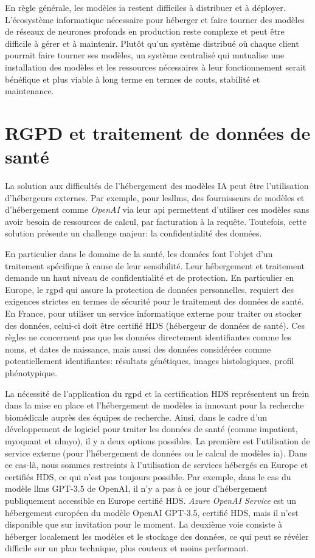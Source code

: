 En règle générale, les modèles \gls{ia} restent difficiles à distribuer et à déployer. L'écosystème informatique nécessaire pour héberger et faire tourner des modèles de réseaux de neurones profonds en production reste complexe et peut être difficile à gérer et à maintenir. Plutôt qu'un système distribué où chaque client pourrait faire tourner ses modèles, un système centralisé qui mutualise une installation des modèles et les ressources nécessaires à leur fonctionnement serait bénéfique et plus viable à long terme en termes de couts, stabilité et maintenance.

\section{RGPD et traitement de données de santé}
La solution aux difficultés de l'hébergement des modèles IA peut être l'utilisation d'hébergeurs externes. Par exemple, pour les\gls{llms}, des fournisseurs de modèles et d'hébergement comme \textit{OpenAI} via leur \gls{api} permettent d'utiliser ces modèles sans avoir besoin de ressources de calcul, par facturation à la requête. Toutefois, cette solution présente un challenge majeur: la confidentialité des données.

En particulier dans le domaine de la santé, les données font l'objet d'un traitement spécifique à cause de leur sensibilité. Leur hébergement et traitement demande un haut niveau de confidentialité et de protection. En particulier en Europe, le \gls{rgpd} qui assure la protection de données personnelles, requiert des exigences strictes en termes de sécurité pour le traitement des données de santé. En France, pour utiliser un service informatique externe pour traiter ou stocker des données, celui-ci doit être certifié HDS (hébergeur de données de santé). Ces règles ne concernent pas que les données directement identifiantes comme les noms, et dates de naissance, mais aussi des données considérées comme potentiellement identifiantes: résultats génétiques, images histologiques, profil phénotypique. 

La nécessité de l'application du \gls{rgpd} et la certification HDS représentent un frein dans la mise en place et l'hébergement de modèles \gls{ia} innovant pour la recherche biomédicale auprès des équipes de recherche. Ainsi, dans le cadre d'un développement de logiciel pour traiter les données de santé (comme \gls{impatient}, \gls{myoquant} et \gls{nlmyo}), il y a deux options possibles. La première est l'utilisation de service externe (pour l'hébergement de données ou le calcul de modèles \gls{ia}). Dans ce cas-là, nous sommes restreints à l'utilisation de services hébergés en Europe et certifiés HDS, ce qui n'est pas toujours possible. Par exemple, dans le cas du modèle \gls{llms} GPT-3.5 de OpenAI, il n'y a pas à ce jour d'hébergement publiquement accessible en Europe certifié HDS. \textit{Azure OpenAI Service} est un hébergement européen du modèle OpenAI GPT-3.5, certifié HDS, mais il n'est disponible que sur invitation pour le moment. La deuxième voie consiste à héberger localement les modèles et le stockage des données, ce qui peut se révéler difficile sur un plan technique, plus couteux et moins performant.

